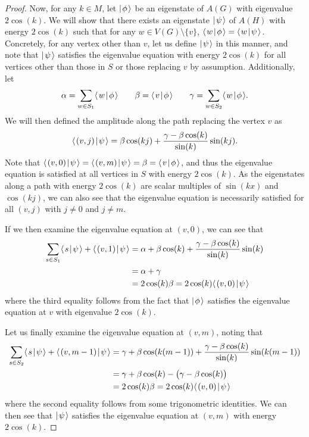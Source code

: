 \documentclass[../thesis-main/thesis-main]{subfiles}
\begin{document}
\begin{proof}
  Now, for any $k\in M$, let $|\mspace{2mu} \phi \mspace{2mu} \rangle$ be an eigenstate of $A(G)$ with eigenvalue $2\cos(k)$.  We will show that there exists an eigenstate $|\mspace{2mu} \psi \mspace{2mu} \rangle$ of $A(H)$ with energy $2\cos(k)$ such that for any $w\in V(G)\setminus \{v\}$, $\langle\mspace{2mu} w \mspace{2mu} | \mspace{2mu} \phi\mspace{2mu} \rangle = \langle\mspace{2mu} w \mspace{2mu} | \mspace{2mu} \psi\mspace{2mu} \rangle$.  Concretely, for any vertex other than $v$, let us define $|\mspace{2mu} \psi \mspace{2mu} \rangle$ in this manner, and note that $|\mspace{2mu} \psi \mspace{2mu} \rangle$ satisfies the eigenvalue equation with energy $2\cos(k)$ for all vertices other than those in $S$ or those replacing $v$ by assumption.  Additionally, let 
  \begin{equation}
    \alpha = \sum_{w\in S_1} \langle\mspace{2mu} w \mspace{2mu} | \mspace{2mu} \phi\mspace{2mu} \rangle \qquad \beta = \langle\mspace{2mu} v \mspace{2mu} | \mspace{2mu} \phi\mspace{2mu} \rangle \qquad \gamma = \sum_{w\in S_2} \langle\mspace{2mu} w \mspace{2mu} | \mspace{2mu} \phi\mspace{2mu} \rangle.
  \end{equation}
  We will then defined the amplitude along the path replacing the vertex $v$ as
  \begin{equation}
    \langle\mspace{2mu} (v,j) \mspace{2mu} | \mspace{2mu} \psi\mspace{2mu} \rangle = \beta \cos(k j) + \frac{\gamma - \beta\cos(k)}{\sin(k)} \sin( k j).
  \end{equation}
  Note that $\langle\mspace{2mu} (v,0) \mspace{2mu} | \mspace{2mu} \psi\mspace{2mu} \rangle = \langle\mspace{2mu} (v,m) \mspace{2mu} | \mspace{2mu} \psi\mspace{2mu} \rangle = \beta = \langle\mspace{2mu} v \mspace{2mu} | \mspace{2mu} \phi\mspace{2mu} \rangle$, and thus the eigenvalue equation is satisfied at all vertices in $S$ with energy $2\cos(k)$.  As the eigenstates along a path with energy $2\cos(k)$ are scalar multiples of $\sin(k x)$ and $\cos(k j)$, we can also see that the eigenvalue equation is necessarily satisfied for all $(v,j)$ with $j\neq 0$ and $j\neq m$.
  
  If we then examine the eigenvalue equation at $(v,0)$, we can see that
  \begin{align}
    \sum_{s\in S_1} \langle\mspace{2mu} s \mspace{2mu} | \mspace{2mu} \psi\mspace{2mu} \rangle + \langle\mspace{2mu} (v,1) \mspace{2mu} | \mspace{2mu} \psi\mspace{2mu} \rangle &= \alpha + \beta \cos(k) + \frac{\gamma - \beta \cos(k)}{\sin(k)} \sin (k) \\
      &= \alpha + \gamma \\
      &= 2 \cos(k) \beta = 2 \cos(k) \langle\mspace{2mu} (v,0) \mspace{2mu} | \mspace{2mu} \psi\mspace{2mu} \rangle
  \end{align}
  where the third equality follows from the fact that $|\mspace{2mu} \phi \mspace{2mu} \rangle$ satisfies the eigenvalue equation at $v$ with eigenvalue $2\cos(k)$. 
  
  Let us finally examine the eigenvalue equation at $(v,m)$, noting that
  \begin{align}
    \sum_{s\in S_2} \langle\mspace{2mu} s \mspace{2mu} | \mspace{2mu} \psi\mspace{2mu} \rangle + \langle\mspace{2mu} (v,m-1) \mspace{2mu} | \mspace{2mu} \psi\mspace{2mu} \rangle &=\gamma + \beta \cos(k (m-1)) + \frac{\gamma - \beta \cos(k)}{\sin(k)} \sin (k(m-1)) \\
      &= \gamma + \beta \cos(k)   -  \big(\gamma - \beta \cos(k)\big)\\
      &= 2 \cos(k) \beta = 2 \cos(k) \langle\mspace{2mu} (v,0) \mspace{2mu} | \mspace{2mu} \psi\mspace{2mu} \rangle
  \end{align}
  where the second equality follows from some trigonometric identities. We can then see that $|\mspace{2mu} \psi \mspace{2mu} \rangle$ satisfies the eigenvalue equation at $(v,m)$ with energy $2\cos(k)$.
  

\end{proof}
\end{document}
